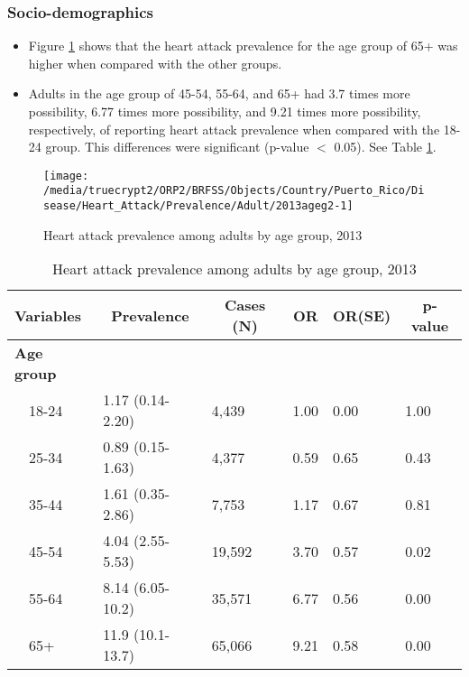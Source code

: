 \newpage
\subsubsection{Socio-demographics}

\begin{itemize}

\item Figure \ref{fig:age.Heart_Attack.2013} shows that the heart attack prevalence for the age group of
65+
was higher when compared with the other groups.

\item Adults in the age group of 45-54, 55-64, and 65+ had 3.7 times more possibility, 6.77 times more possibility, and 9.21 times more possibility, respectively, of reporting heart attack prevalence when compared with the 18-24 group. This differences were significant (p-value $<$ 0.05). See Table \ref{tab:age.Heart_Attack.2013}.


\end{itemize}


\begin{figure}[H]
\caption{Heart attack prevalence among adults by age group, 
2013}
\begin{knitrout}
\color{fgcolor}

{\centering \texttt{[image: /media/truecrypt2/ORP2/BRFSS/Objects/Country/Puerto\_Rico/Disease/Heart\_Attack/Prevalence/Adult/2013ageg2-1]} 

}



\end{knitrout}
\label{fig:age.Heart_Attack.2013}
\end{figure}

\begin{table}[H]
\caption{Heart attack prevalence among adults by age group, 2013\label{tab:age.Heart_Attack.2013}} 
\begin{center}
\begin{tabular}{llllll}
\hline\hline
\multicolumn{1}{l}{Variables}&\multicolumn{1}{c}{Prevalence}&\multicolumn{1}{c}{Cases (N)}&\multicolumn{1}{c}{OR}&\multicolumn{1}{c}{OR(SE)}&\multicolumn{1}{c}{p-value}\tabularnewline
\hline
{\bfseries Age group}&&&&&\tabularnewline
~~18-24&1.17 (0.14-2.20)& 4,439&1.00&0.00&1.00\tabularnewline
~~25-34&0.89 (0.15-1.63)& 4,377&0.59&0.65&0.43\tabularnewline
~~35-44&1.61 (0.35-2.86)& 7,753&1.17&0.67&0.81\tabularnewline
~~45-54&4.04 (2.55-5.53)&19,592&3.70&0.57&0.02\tabularnewline
~~55-64&8.14 (6.05-10.2)&35,571&6.77&0.56&0.00\tabularnewline
~~65+&11.9 (10.1-13.7)&65,066&9.21&0.58&0.00\tabularnewline
\hline
\end{tabular}\end{center}

\end{table}


